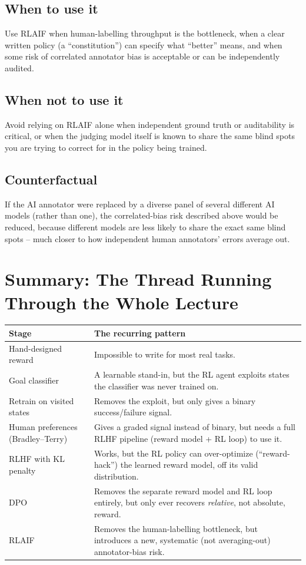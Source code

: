 \documentclass[11pt]{article}
\begin{document}
\subsection{When to use it}
Use RLAIF when human-labelling throughput is the bottleneck, when a clear written
policy (a ``constitution'') can specify what ``better'' means, and when some risk
of correlated annotator bias is acceptable or can be independently audited.

\subsection{When not to use it}
Avoid relying on RLAIF alone when independent ground truth or auditability is
critical, or when the judging model itself is known to share the same blind
spots you are trying to correct for in the policy being trained.

\subsection{Counterfactual}
If the AI annotator were replaced by a diverse panel of several different AI
models (rather than one), the correlated-bias risk described above would be
reduced, because different models are less likely to share the exact same blind
spots -- much closer to how independent human annotators' errors average out.

\section{Summary: The Thread Running Through the Whole Lecture}

\begin{center}
\begin{longtable}{|>{\raggedright\arraybackslash}p{4.2cm}|>{\raggedright\arraybackslash}p{9.3cm}|}
\hline
\textbf{Stage} & \textbf{The recurring pattern} \\
\hline
Hand-designed reward & Impossible to write for most real tasks. \\
\hline
Goal classifier & A learnable stand-in, but the RL agent exploits states the
classifier was never trained on. \\
\hline
Retrain on visited states & Removes the exploit, but only gives a binary
success/failure signal. \\
\hline
Human preferences (Bradley--Terry) & Gives a graded signal instead of binary, but
needs a full RLHF pipeline (reward model + RL loop) to use it. \\
\hline
RLHF with KL penalty & Works, but the RL policy can over-optimize
(``reward-hack'') the learned reward model, off its valid distribution. \\
\hline
DPO & Removes the separate reward model and RL loop entirely, but only ever
recovers \emph{relative}, not absolute, reward. \\
\hline
RLAIF & Removes the human-labelling bottleneck, but introduces a new, systematic
(not averaging-out) annotator-bias risk. \\
\hline
\end{longtable}
\end{center}
\end{document}
